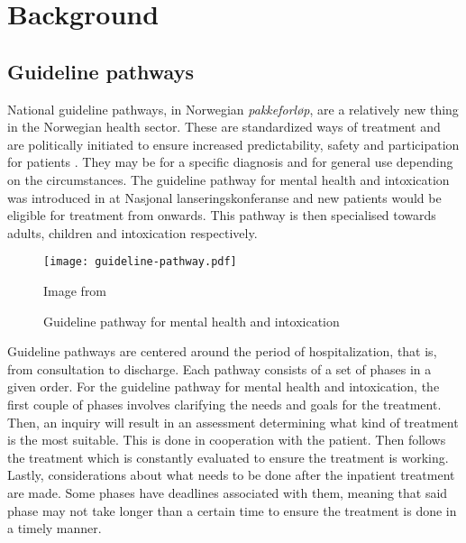 \chapter{Background}
\label{ch:background}



\section{Guideline pathways}
\label{sec:pathways}

National guideline pathways, in Norwegian \emph{pakkeforløp}, are a relatively new thing in the Norwegian health sector. These are standardized ways of treatment and are politically initiated to ensure increased predictability, safety and participation for patients \autocite{helsedirektoratet2019}. They may be for a specific diagnosis and for general use depending on the circumstances. The guideline pathway for mental health and intoxication was introduced in  at Nasjonal lanseringskonferanse \autocite{haugland2018} and new patients would be eligible for treatment from  onwards. This pathway is then specialised towards adults, children and intoxication respectively. %

\begin{figure}
    \centering
    \texttt{[image: guideline-pathway.pdf]}
    \caption{Guideline pathway for mental health and intoxication}
    Image from \textcite{haugland2018}
    \label{fig:guideline-pathway}
\end{figure}

Guideline pathways are centered around the period of hospitalization, that is, from consultation to discharge. Each pathway consists of a set of phases in a given order. For the guideline pathway for mental health and intoxication, the first couple of phases involves clarifying the needs and goals for the treatment. Then, an inquiry will result in an assessment determining what kind of treatment is the most suitable. This is done in cooperation with the patient. Then follows the treatment which is constantly evaluated to ensure the treatment is working. Lastly, considerations about what needs to be done after the inpatient treatment are made. Some phases have deadlines associated with them, meaning that said phase may not take longer than a certain time to ensure the treatment is done in a timely manner.

